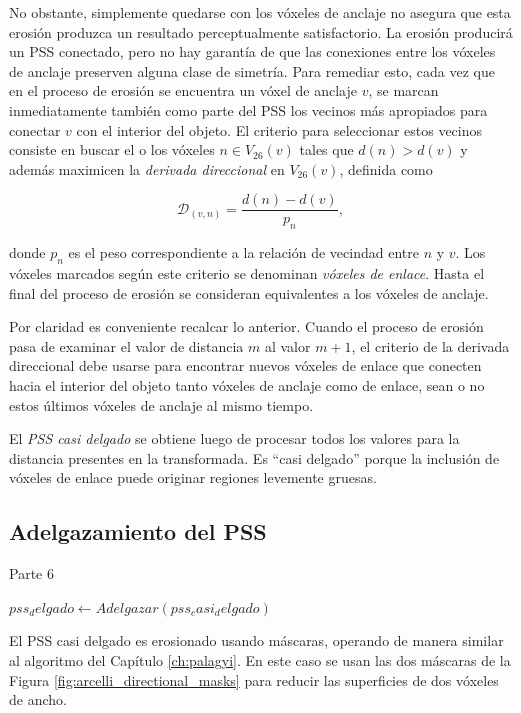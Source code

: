 No obstante, simplemente quedarse con los vóxeles de anclaje no asegura que esta erosión produzca un resultado perceptualmente satisfactorio. La erosión producirá un PSS conectado, pero no hay garantía de que las conexiones entre los vóxeles de anclaje preserven alguna clase de simetría. Para remediar esto, cada vez que en el proceso de erosión se encuentra un vóxel de anclaje $v$, se marcan inmediatamente también como parte del PSS los vecinos más apropiados para conectar $v$ con el interior del objeto. El criterio para seleccionar estos vecinos consiste en buscar el o los vóxeles $n \in V_{26}(v)$ tales que $d(n) > d(v)$ y además maximicen la \textit{derivada direccional} en $V_{26}(v)$, definida como

\begin{equation}
\mathcal{D}_{(v,n)} = \frac{d(n) - d(v)}{p_n},
\end{equation}

\noindent
donde $p_n$ es el peso correspondiente a la relación de vecindad entre $n$ y $v$. Los vóxeles marcados según este criterio se denominan \textit{vóxeles de enlace}. Hasta el final del proceso de erosión se consideran equivalentes a los vóxeles de anclaje.

Por claridad es conveniente recalcar lo anterior. Cuando el proceso de erosión pasa de examinar el valor de distancia $m$ al valor $m + 1$, el criterio de la derivada direccional debe usarse para encontrar nuevos vóxeles de enlace que conecten hacia el interior del objeto tanto vóxeles de anclaje como de enlace, sean o no estos últimos vóxeles de anclaje al mismo tiempo.

El \textit{PSS casi delgado} se obtiene luego de procesar todos los valores para la distancia presentes en la transformada. Es ``casi delgado'' porque la inclusión de vóxeles de enlace puede originar regiones levemente gruesas.

\subsection{Adelgazamiento del PSS}

\begin{algorithm}[H]
\caption{Parte 6}
\begin{algorithmic}[1]
\State $pss_delgado \gets Adelgazar(pss_casi_delgado)$
\end{algorithmic}
\end{algorithm}

El PSS casi delgado es erosionado usando máscaras, operando de manera similar al algoritmo del Capítulo \ref{ch:palagyi}. En este caso se usan las dos máscaras de la Figura \ref{fig:arcelli_directional_masks} para reducir las superficies de dos vóxeles de ancho.

